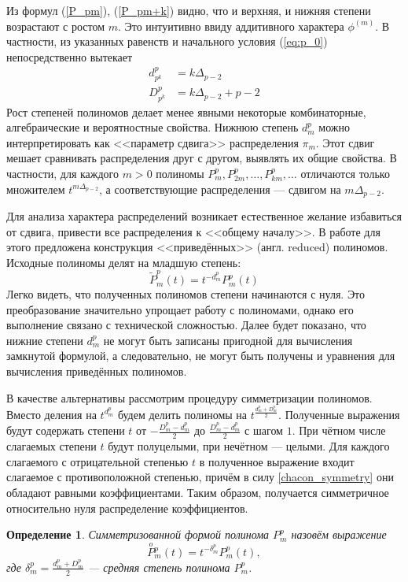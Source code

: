 \documentclass[14pt, a4paper, russian]{report}
\newtheorem{definition}{\indent Определение}
\newcommand{\SymPol}[2]{\overset{o}{P}{}^{#1}_{#2}}
\begin{document}
Из формул (\ref{P_pm}), (\ref{P_pm+k}) видно, что и верхняя, и нижняя степени возрастают с ростом $m$. Это интуитивно ввиду аддитивного характера $\phi^{(m)}$. В частности, из указанных равенств и начального условия (\ref{eq:p_0}) непосредственно вытекает
\begin{align*}
d_{p^k}^p &= k \Delta_{p-2}\\
D_{p^k}^p &= k \Delta_{p-2} + p - 2
\end{align*}
Рост степеней полиномов делает менее явными некоторые комбинаторные, алгебраические и вероятностные свойства. Нижнюю степень $d_m^p$ можно интерпретировать как <<параметр сдвига>> распределения $\pi_m$. Этот сдвиг мешает сравнивать распределения друг с другом, выявлять их общие свойства. В частности, для каждого $m > 0$ полиномы $P_m^p, P_{2m}^p, \ldots, P_{km}^p,\ldots$ отличаются только множителем $t^{m\Delta_{p-2}}$, а соответствующие распределения --- сдвигом на $m\Delta_{p-2}$. 

Для анализа характера распределений возникает естественное желание избавиться от сдвига, привести все распределения к <<общему началу>>. В работе \cite{weaklimits} для этого предложена конструкция <<приведённых>> (англ. reduced) полиномов. Исходные полиномы делят на младшую степень: $$\tilde{P}_m^p(t) = t^{-d_m^p}P_m^p(t)$$
Легко видеть, что полученных полиномов степени начинаются с нуля. Это преобразование значительно упрощает работу с полиномами, однако его выполнение связано с технической сложностью. Далее будет показано, что нижние степени $d_m^p$ не могут быть записаны пригодной для вычисления замкнутой формулой, а следовательно, не могут быть получены и уравнения для вычисления приведённых полиномов.

В качестве альтернативы рассмотрим процедуру симметризации полиномов. Вместо деления на $t^{d_m^p}$ будем делить полиномы на $t^{\frac{d_m^p+D_m^p}{2}}$. Полученные выражения будут содержать степени $t$ от $-\frac{D_m^p - d_m^p}{2}$ до $\frac{D_m^p - d_m^p}{2}$ с шагом $1$. При чётном числе слагаемых степени $t$ будут полуцелыми, при нечётном --- целыми. Для каждого слагаемого с отрицательной степенью $t$ в полученное выражение входит слагаемое с противоположной степенью, причём в силу \cref{chacon_symmetry} они обладают равными коэффициентами. Таким образом, получается симметричное относительно нуля распределение коэффициентов.

\begin{definition}
Симметризованной формой полинома $P_m^p$ назовём выражение
$$ \SymPol{p}{m}(t) = t^{-\delta_m^p}P_m^p(t),$$
где $\delta_m^p=\frac{d_m^p+D_m^p}{2}$ --- средняя степень полинома $P_m^p$.
\end{definition}
\end{document}

